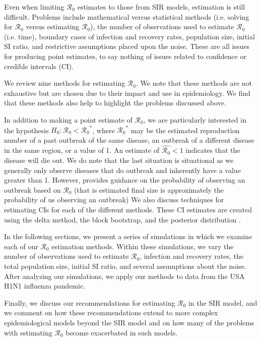 \documentclass[12pt]{article}
\newcommand{\wxxsir}{nine } %
\newcommand{\rr}{\ensuremath{\mathcal{R}_0}}
\begin{document}
Even when limiting $\rr$ estimates to those from SIR models, estimation is still difficult.  Problems include mathematical versus statistical methods (i.e. solving for $\rr$ versus estimating $\rr$), the number of observations used to estimate $\rr$ (i.e. time), boundary cases of infection and recovery rates, population size, initial SI ratio, and restrictive assumptions placed upon the noise.  These are all issues for producing point estimates, to say nothing of issues related to confidence or credible intervals (CI).

We review \wxxsir methods for estimating $\rr$.  We note that these methods are not exhaustive but are chosen due to their impact and use in epidemiology.  We find that these methods also help to highlight the problems discussed above.

In addition to making a point estimate of $\rr$, we are particularly interested in the hypothesis  $H_0: \rr < \rr^*$, where $\rr^*$ may be the estimated reproduction number of a past outbreak of the same disease, an outbreak of a different disease in the same region, or a value of 1.  An estimate of $\hat{\rr}<1$ indicates that the disease will die out.  We do note that the last situation is situational as we generally only observe diseases that do outbreak and inherently have a value greater than 1.  However, \cite{britton2010} provides guidance on the probability of observing an outbreak based on $\rr$ (that is estimated final size is approximately the probability of us observing an outbreak)   We also discuss techniques for estimating CIs for each of the different methods.  These CI estimates are created using the delta method, the block bootstrap, and the posterior distribution \citep{cao1999,wasserman2004}.

In the following sections, we present a series of simulations in which we examine each of our $\rr$ estimation methods.  Within these simulations, we vary the number of observations used to estimate $\rr$, infection and recovery rates, the total population size, initial SI ratio, and several assumptions about the noise.  After analyzing our simulations, we apply our methods to data from the USA H1N1 influenza pandemic.


Finally, we discuss our recommendations for estimating $\rr$ in the SIR model, and we comment on how these recommendations extend to more complex epidemiological models beyond the SIR model and on how many of the problems with estimating $\rr$  become exacerbated in such models.
\end{document}

